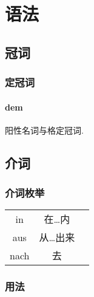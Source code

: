 \documentclass[hidelinks]{ctexart}
\begin{document}



\section{语法} %
\label{sec:语法}

\subsection{冠词} %
\label{sub:冠词}

\subsubsection{定冠词} %
\label{ssub:定冠词}

\paragraph{dem} %
\label{par:dem}

阳性名词与格定冠词. 




\subsection{介词} %
\label{sub:介词}

\subsubsection{介词枚举} %
\label{ssub:介词枚举}

\begin{longtable}{|c|c|c}
    \cline{1-2}
    in & 在\ldots 内\\
    \cline{1-2}
    aus & 从\ldots 出来\\
    \cline{1-2}
    nach & 去\\
    \cline{1-2}
\end{longtable}


\subsubsection{用法} %
\label{ssub:用法}
\end{document}
